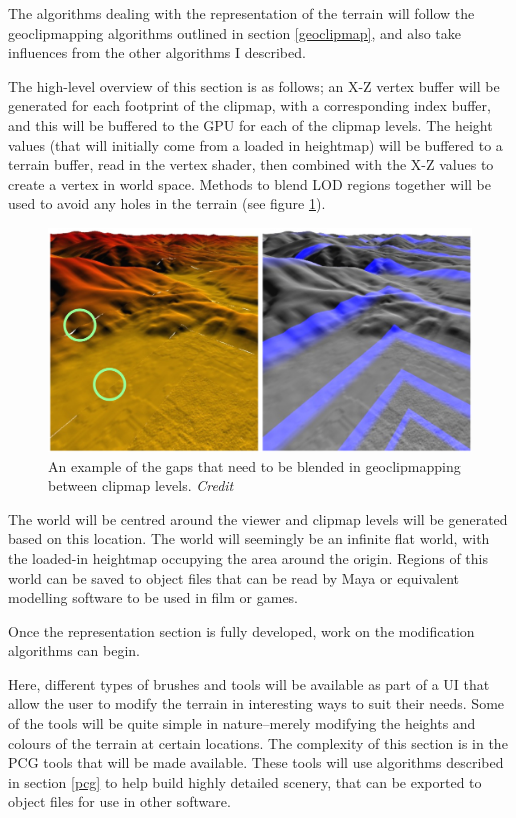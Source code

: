 \documentclass[notitlepage,12pt]{article}
\begin{document}
The algorithms dealing with the representation of the terrain will follow the geoclipmapping algorithms outlined in section \ref{geoclipmap}, and also take influences from the other algorithms I described. 

The high-level overview of this section is as follows; an X-Z vertex buffer will be generated for each footprint of the clipmap, with a corresponding index buffer, and this will be buffered to the GPU for each of the clipmap levels. The height values (that will initially come from a loaded in heightmap) will be buffered to a terrain buffer, read in the vertex shader, then combined with the X-Z values to create a vertex in world space. Methods to blend LOD regions together will be used to avoid any holes in the terrain (see figure \ref{fig:blending}).

\begin{figure}[ht]
  \centering
  \includegraphics[width=1.0\textwidth]{blen_regions_and_gaps.png}
  \caption{An example of the gaps that need to be blended in geoclipmapping between clipmap levels. \textit{Credit \cite{geoclipmapping}}}
  \label{fig:blending}
\end{figure}

The world will be centred around the viewer and clipmap levels will be generated based on this location. The world will seemingly be an infinite flat world, with the loaded-in heightmap occupying the area around the origin. Regions of this world can be saved to object files that can be read by Maya or equivalent modelling software to be used in film or games.

Once the representation section is fully developed, work on the modification algorithms can begin. 

Here, different types of brushes and tools will be available as part of a UI that allow the user to modify the terrain in interesting ways to suit their needs. Some of the tools will be quite simple in nature--merely modifying the heights and colours of the terrain at certain locations. The complexity of this section is in the PCG tools that will be made available. These tools will use algorithms described in section \ref{pcg} to help build highly detailed scenery, that can be exported to object files for use in other software.
\end{document}
